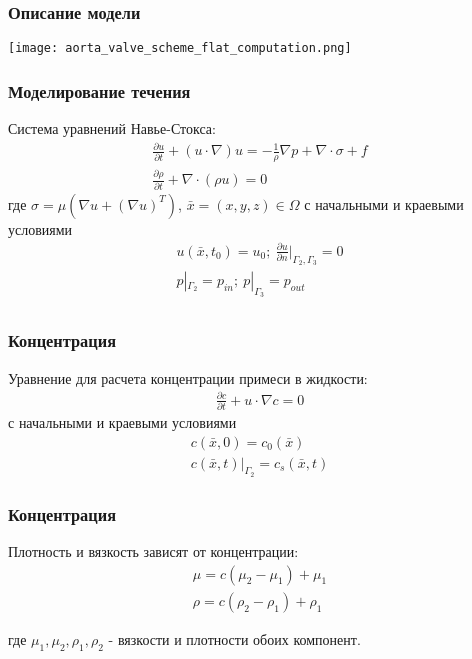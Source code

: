 \documentclass[14pt]{beamer}
\begin{document}
\begin{frame}
\frametitle{Описание модели}
    \begin{center}
        \texttt{[image: aorta\_valve\_scheme\_flat\_computation.png]}
    \end{center}
\end{frame}

\begin{frame}
\frametitle{Моделирование течения}
Система уравнений Навье-Стокса:
\begin{gather}
    \label{eq:motion}
    \frac{\partial u}{\partial t} + (u \cdot \nabla) u = - \frac{1}{\rho} \nabla p + \nabla \cdot \sigma + f\\
    \label{eq:continuity}
    \frac{\partial \rho}{\partial t} + \nabla \cdot (\rho u) = 0
\end{gather}
где $\sigma = \mu (\nabla u + (\nabla u)^{T})$, $\bar{x} = (x, y, z) \in \Omega$ с начальными и краевыми условиями
\begin{gather*}
    u(\bar{x}, t_0) = u_0;\ \frac{\partial u}{\partial n}|_{\Gamma_2, \Gamma_3} = 0\\
    p|_{\Gamma_2} = p_{in};\ p|_{\Gamma_3} = p_{out} \\
\end{gather*}

\end{frame}

\begin{frame}
\frametitle{Концентрация}
Уравнение для расчета концентрации примеси в жидкости:
\begin{gather}
    \label{eq:concentration}
    \frac{\partial c}{\partial t} + u \cdot \nabla c = 0
\end{gather}
с начальными и краевыми условиями
\begin{gather*}
    c(\bar{x}, 0) = c_0(\bar{x})\\
    c(\bar{x}, t)|_{\Gamma_2} = c_s(\bar{x}, t)
\end{gather*}

\end{frame}

\begin{frame}
\frametitle{Концентрация}
Плотность и вязкость зависят от концентрации:
\begin{gather}
    \label{eq:concentration_viscosity}
    \mu = c (\mu_2 - \mu_1) + \mu_1\\
    \label{eq:concentration_density}
    \rho = c (\rho_2 - \rho_1) + \rho_1
\end{gather}

где $\mu_1, \mu_2, \rho_1, \rho_2$ - вязкости и плотности обоих компонент.
\end{frame}
\end{document}
